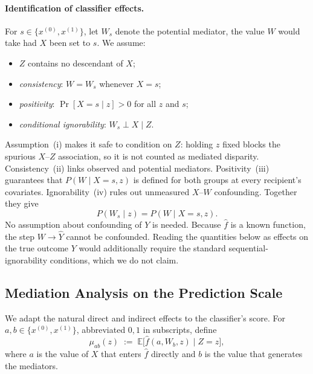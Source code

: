 \paragraph{Identification of classifier effects.}\label{sec:identification-assumptions}
For $s\in\{x^{(0)},x^{(1)}\}$, let $W_s$ denote the potential mediator, the
value $W$ would take had $X$ been set to $s$. We assume:
\begin{itemize}[nosep]
    \item[(i)] $Z$ contains no descendant of $X$;
    \item[(ii)] \emph{consistency}: $W = W_s$ whenever $X=s$;
    \item[(iii)] \emph{positivity}: $\Pr[X=s \mid z] > 0$ for all $z$ and $s$;
    \item[(iv)] \emph{conditional ignorability}: $W_s \perp X \mid Z$.
\end{itemize}
Assumption~(i) makes it safe to condition on $Z$: holding $z$ fixed blocks the
spurious $X$--$Z$ association, so it is not counted as mediated disparity.
Consistency~(ii) links observed and potential mediators. Positivity~(iii)
guarantees that $P(W\mid X=s,z)$ is defined for both groups at every
recipient's covariates. Ignorability~(iv) rules out unmeasured $X$--$W$
confounding. Together they give
\begin{equation}
  P(W_s\mid z)=P(W\mid X=s,z).
  \label{eq:mediator_id}
\end{equation}
No assumption about confounding of $Y$ is needed. Because $\hat f$ is a known
function, the step $W\to\hat Y$ cannot be confounded. Reading the quantities
below as effects on the true outcome $Y$ would additionally require the
standard sequential-ignorability conditions, which we do not claim.


\subsection{Mediation Analysis on the Prediction Scale}
\label{sec:mediation_background}

We adapt the natural direct and indirect effects
\citep{robins1992identifiability,pearl2001direct} to the classifier's score.
For $a,b\in\{x^{(0)},x^{(1)}\}$, abbreviated $0,1$ in subscripts, define
\begin{equation}
  \mu_{ab}(z)\;:=\;\mathbb E\bigl[\hat f(a,W_b,z)\mid Z=z\bigr],
  \label{eq:mu_ab}
\end{equation}
where $a$ is the value of $X$ that enters $\hat f$ directly and $b$ is the value
that generates the mediators.

